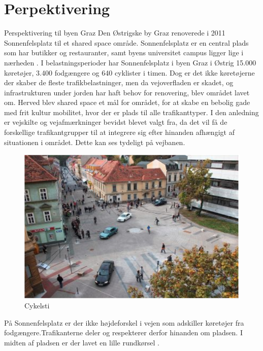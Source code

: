 \chapter{Perpektivering}
\label{chap:perpektivering}

Perspektivering til byen Graz
Den Østrigske by Graz renoverede i 2011 Sonnenfelsplatz til et shared space område. Sonnenfelsplatz er en central plads som har butikker og restauranter, samt byens universitet campus ligger lige i nærheden .
 I belastningsperioder har Sonnenfelsplatz i byen Graz i Østrig 15.000 køretøjer, 3.400 fodgængere og 640 cyklister i timen. Dog er det ikke køretøjerne der skaber de fleste trafikbelastninger, men da vejoverfladen er skadet, og infrastrukturen under jorden har haft behov for renovering, blev området lavet om. Herved blev shared space et mål for området, for at skabe en bebolig gade med frit kultur mobilitet, hvor der er plads til alle trafikanttyper. I den anledning er vejskilte og vejafmærkninger bevidst blevet valgt fra, da det vil få de forskellige trafikantgrupper til at integrere sig efter hinanden afhængigt af situationen i området. Dette kan ses tydeligt på vejbanen.
 \begin{figure}[htbp]
   \centering
   \begin{adjustbox}{max width=\textwidth}
     \includegraphics{figures/Billederogfigur/Perspektivering/en_andne_by.png}
  \end{adjustbox}
   \caption{Cykelsti }
    \label{fig:cykelsti}
 \end{figure}
 
 På Sonnenfelsplatz er der ikke højdeforskel i vejen som adskiller køretøjer fra fodgængere.Trafikanterne deler og respekterer derfor hinanden om pladsen. I midten af pladsen er der lavet en lille rundkørsel .

